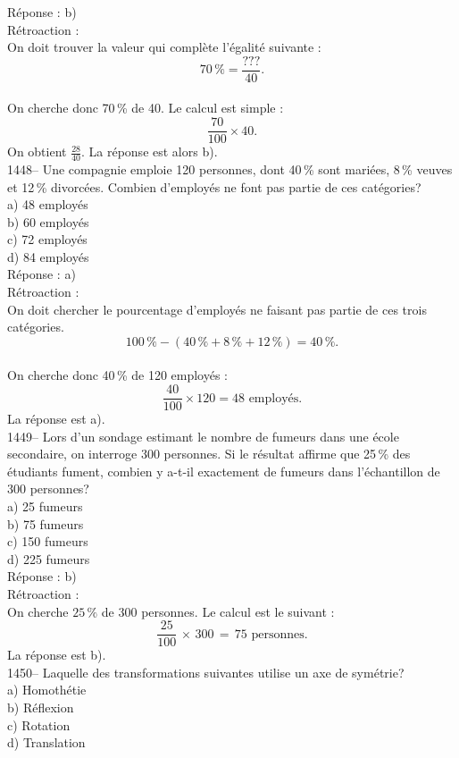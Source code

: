 R\'eponse : b)\\

R\'etroaction :\\
On doit trouver la valeur qui compl\`ete l'\'egalit\'e suivante
:$$70\,\%=\frac{???}{40}.$$\\

On cherche donc 70\,\% de 40. Le calcul est
simple :$$\frac{70}{100}\times40.$$On obtient $\frac{28}{40}$. La r\'eponse
est alors b).\\

1448-- Une compagnie emploie 120 personnes, dont 40\,\% sont
mari\'ees, 8\,\% veuves et 12\,\% divorc\'ees. Combien d'employ\'es
ne font pas partie de ces cat\'egories?\\
a) 48 employ\'es\\
b) 60 employ\'es\\
c) 72 employ\'es\\
d) 84 employ\'es\\

R\'eponse : a)\\

R\'etroaction :\\
On doit chercher le pourcentage d'employ\'es ne faisant pas partie
de ces trois
cat\'egories.$$100\,\%-(40\,\%+8\,\%+12\,\%)=40\,\%.$$\\On cherche
donc 40\,\% de 120 employ\'es :
$$\frac{40}{100}\times120=48 {\textrm{ employ\'es.}}$$ La r\'eponse est
a).\\

1449-- Lors d'un sondage estimant le nombre de fumeurs dans une
\'ecole secondaire, on interroge 300 personnes. Si le r\'esultat
affirme que 25\,\% des \'etudiants fument, combien y a-t-il
exactement de fumeurs dans
l'\'echantillon de 300 personnes?\\
a) 25 fumeurs\\
b) 75 fumeurs\\
c) 150 fumeurs\\
d) 225 fumeurs\\

R\'eponse : b)\\

R\'etroaction :\\
On cherche $25\,\%$ de $300$ personnes. Le calcul est le suivant :
$$\frac{25}{100}\,\times\,300\,=\,75 {\textrm{ personnes.}}$$ La r\'eponse
est b).\\

1450-- Laquelle des transformations suivantes utilise un axe de sym\'etrie?\\
a) Homoth\'etie\\
b) R\'eflexion\\
c) Rotation\\
d) Translation\\

